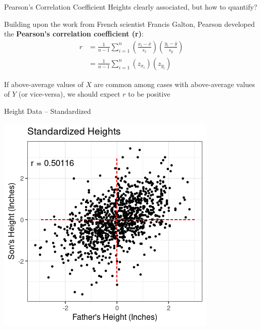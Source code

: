 \documentclass{beamer}
\begin{document}
\begin{frame}{Pearson's Correlation Coefficient}
Heights clearly associated, but how to quantify? \vspace{2mm}

Building upon the work from French scientist Francis Galton, Pearson developed the \textbf{Pearson's correlation coefficient (r)}:
\vspace{2mm}
\begin{align*}
r &= \frac{1}{n-1} \sum_{i=1}^n \left( \frac{x_i - \overline{x}}{s_x} \right) \left( \frac{y_i - \overline{y}}{s_y} \right) \\
&= \frac{1}{n-1} \sum_{i=1}^n (z_{x_i} ) (z_{y_i})
\end{align*}
\vspace{2mm}

If above-average values of $X$ are common among cases with above-average values of $Y$ (or vice-versa), we should expect $r$ to be positive
\end{frame}

\begin{frame}{Height Data -- Standardized}
\begin{center}
\includegraphics[scale=0.5]{father_son2.png}
\end{center}
\end{frame}
\end{document}
